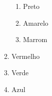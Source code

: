 \documentclass[12pt]{beamer}
\begin{document}
\begin{frame}
\begin{columns}
\begin{column}{4cm}
\begin{enumerate}
\begin{enumerate}
                    \item Preto \theordem
                    \item <2> Amarelo \theordem
                    \item Marrom \theordem
                \end{enumerate}
                \item Vermelho \theordem
                \item Verde \theordem
                \item Azul \theordem
            \end{enumerate}
        \end{column}
    \end{columns}


\end{frame}

\end{document}
